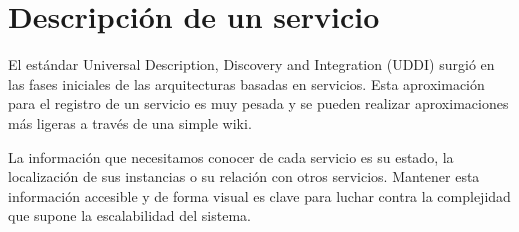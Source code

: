 \documentclass[11pt,a4paper]{article}
\begin{document}
\section{Descripción de un servicio}

El estándar Universal Description, Discovery and Integration (UDDI) surgió en las fases iniciales de las arquitecturas basadas en servicios. Esta aproximación para el registro de un servicio es muy pesada y se pueden realizar aproximaciones más ligeras a través de una simple wiki. 

La información que necesitamos conocer de cada servicio es su estado, la localización de sus instancias o su relación con otros servicios. Mantener esta información accesible y de forma visual es clave para luchar contra la complejidad que supone la escalabilidad del sistema.
\end{document}
